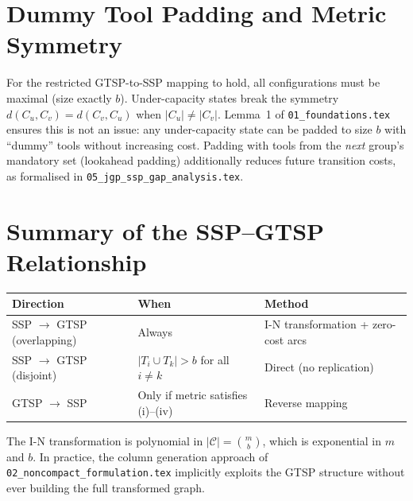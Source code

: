 \documentclass[11pt,a4paper]{article}
\theoremstyle{plain}
\theoremstyle{definition}
\begin{document}
\section{Dummy Tool Padding and Metric Symmetry}
\label{sec:dummy_padding}

For the restricted GTSP-to-SSP mapping to hold, all configurations must be
maximal (size exactly $b$). Under-capacity states break the symmetry $d(C_u,C_v)=d(C_v,C_u)$ when $|C_u| \ne |C_v|$. Lemma~1 of
\texttt{01\_foundations.tex} ensures this is not an issue: any under-capacity
state can be padded to size $b$ with ``dummy'' tools without increasing cost.
Padding with tools from the \emph{next} group's mandatory set (lookahead padding)
additionally reduces future transition costs, as formalised in
\texttt{05\_jgp\_ssp\_gap\_analysis.tex}.

\section{Summary of the SSP–GTSP Relationship}
\label{sec:summary}

\begin{center}
\begin{tabular}{lll}
\toprule
Direction & When & Method \\
\midrule
SSP $\to$ GTSP (overlapping) & Always & I-N transformation + zero-cost arcs \\
SSP $\to$ GTSP (disjoint)    & $|T_i \cup T_k|>b$ for all $i \ne k$ & Direct (no replication) \\
GTSP $\to$ SSP & Only if metric satisfies (i)–(iv) & Reverse mapping \\
\bottomrule
\end{tabular}
\end{center}

\noindent The I-N transformation is polynomial in $|\mathcal{C}|=\binom{m}{b}$,
which is exponential in $m$ and $b$. In practice, the column generation approach
of \texttt{02\_noncompact\_formulation.tex} implicitly exploits the GTSP structure
without ever building the full transformed graph.



\end{document}
